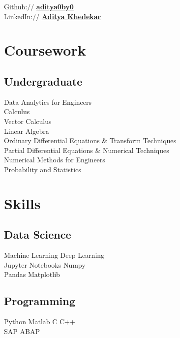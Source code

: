 \documentclass[]{deedy-resume-openfont}
\begin{document}
\begin{minipage}[t]{0.33\textwidth}
Github:// \href{https://github.com/aditya0by0}{\bf aditya0by0} \\

LinkedIn://  \href{https://www.linkedin.com/in/aditya-khedekar-b1979013b/}{\bf Aditya Khedekar} 

\sectionsep

\section{Coursework}

\vspace{5pt}
\subsection{Undergraduate}
\vspace{3pt}
Data Analytics for Engineers \\
Calculus \\
Vector Calculus \\
Linear Algebra \\
Ordinary Differential Equations \& Transform Techniques\\
Partial Differential Equations \& \space Numerical Techniques\\
Numerical Methods for Engineers\\
Probability and Statistics\\
\sectionsep


\section{Skills}

\vspace{5pt}
\subsection{Data Science}
\vspace{2pt}
Machine Learning \textbullet{} Deep Learning\\
Jupyter Notebooks \textbullet{} Numpy \\
\textbullet{} Pandas \textbullet{} Matplotlib\\ 

\vspace{8pt}
\subsection{Programming}
\vspace{2pt}
 Python \textbullet{} Matlab \textbullet{}
C \textbullet{} C++ \\
SAP ABAP \\


\end{minipage}
\end{document}
